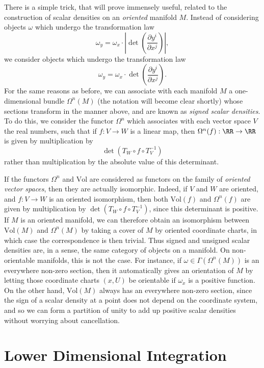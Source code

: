 There is a simple trick, that will prove immensely useful, related to the construction of scalar densities on an \emph{oriented} manifold $M$. Instead of considering objects $\omega$ which undergo the transformation law
%
\[ \omega_y = \omega_x \cdot \left| \det \left( \frac{\partial y^i}{\partial x^j} \right) \right|, \]
%
we consider objects which undergo the transformation law
%
\[ \omega_y = \omega_x \cdot \det \left( \frac{\partial y^i}{\partial x^j} \right). \]
%
For the same reasons as before, we can associate with each manifold $M$ a one-dimensional bundle $\Omega^n(M)$ (the notation will become clear shortly) whose sections transform in the manner above, and are known as \emph{signed scalar densities}. To do this, we consider the functor $\Omega^n$ which associates with each vector space $V$ the real numbers, such that if $f: V \to W$ is a linear map, then $\Omega^n(f): \RR \to \RR$ is given by multiplication by
%
\[ \det(T_W \circ f \circ T_V^{-1}) \]
%
rather than multiplication by the absolute value of this determinant.

If the functors $\Omega^n$ and $\text{Vol}$ are considered as functors on the family of \emph{oriented vector spaces}, then they are actually isomorphic. Indeed, if $V$ and $W$ are oriented, and $f: V \to W$ is an oriented isomorphism, then both $\text{Vol}(f)$ and $\Omega^n(f)$ are given by multiplication by $\det(T_W \circ f \circ T_V^{-1})$, since this determinant is positive. If $M$ is an oriented manifold, we can therefore obtain an isomorphism between $\text{Vol}(M)$ and $\Omega^n(M)$ by taking a cover of $M$ by oriented coordinate charts, in which case the correspondence is then trivial. Thus signed and unsigned scalar densities are, in a sense, the same category of objects on a manifold. On non-orientable manifolds, this is not the case. For instance, if $\omega \in \Gamma(\Omega^n(M))$ is an everywhere non-zero section, then it automatically gives an orientation of $M$ by letting those coordinate charts $(x,U)$ be orientable if $\omega_x$ is a positive function. On the other hand, $\text{Vol}(M)$ always has an everywhere non-zero section, since the sign of a scalar density at a point does not depend on the coordinate system, and so we can form a partition of unity to add up positive scalar densities without worrying about cancellation.

\section{Lower Dimensional Integration}

